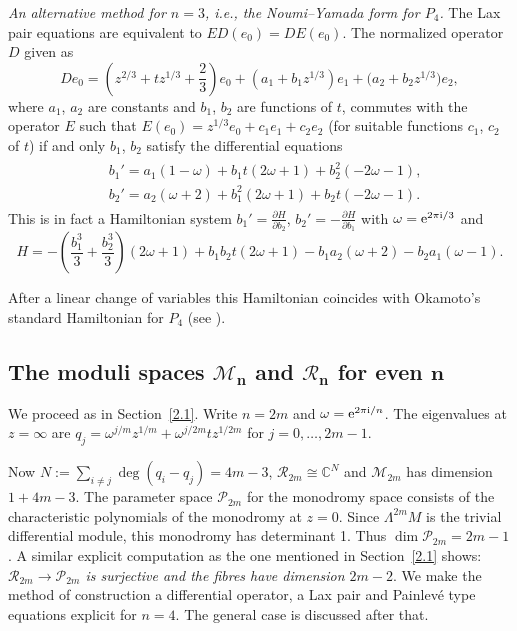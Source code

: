 \documentclass[pdftex]{sigma}
\numberwithin{equation}{section}
\begin{document}
 {\it An alternative method for $n=3$, i.e., the Noumi--Yamada form for $P_4$.}
The Lax pair equations are equivalent to $ED(e_0)=DE(e_0)$. The
normalized operator $D$ given as
\[De_0=\left(z^{2/3}+tz^{1/3}+\frac{2}{3}\right)e_0+(a_1+b_1z^{1/3})e_1+\bigl(a_2+b_2z^{1/3}\bigr)e_2,\] where
$a_1$, $a_2$ are constants and $b_1$, $b_2$ are functions of $t$, commutes with the operator $ E$ such that
$E(e_0)=z^{1/3}e_0+c_1e_1+c_2e_2$ (for suitable functions $c_1$, $c_2$ of $t$) if and only $b_1$, $b_2$ satisfy the differential equations
\begin{gather*}
\begin{split}
& b_1'=a_1(1-\omega)+b_1t(2\omega +1)+b_2^2(-2\omega -1),\\
& b_2'=a_2(\omega +2)+b_1^2(2\omega +1) +b_2t(-2\omega -1).
\end{split}
\end{gather*}
This is in fact a Hamiltonian system $b_1'=\frac{\partial H}{\partial b_2}$, $b_2'=-\frac{\partial H}{\partial b_1}$
with $\omega={\rm e}^{2\pi {\rm i}/3}$ and
\[
H=-\left(\frac{b_1^3}{3}+\frac{b_2^3}{3}\right)(2\omega +1)+b_1b_2t(2\omega +1)-b_1a_2(\omega +2) -b_2a_1(\omega -1).\]

After a linear change of variables this Hamiltonian coincides with Okamoto's standard Hamiltonian for $P_4$
(see \cite[p.~265]{O1}).

\subsection[The moduli spaces M\_n and R\_n for even n]{The moduli spaces $\boldsymbol{\mathcal{M}_n}$ and $\boldsymbol{\mathcal{R}_n}$ for even $\boldsymbol{n}$}

We proceed as in Section~\ref{2.1}.
Write $n=2m$ and $\omega ={\rm e}^{2\pi {\rm i}/n}$. The eigenvalues at $z=\infty$ are
$q_j= \omega^{j/m}z^{1/m}+ \omega ^{j/2m}tz^{1/2m}$ for $j=0,\dots ,2m-1$.

Now $N:=\sum _{i\neq j} \deg (q_i-q_j)=4m-3$, $\mathcal{R}_{2m}\cong \mathbb{C}^{N}$ and $\mathcal{M}_{2m}$
has dimension $1+4m-3$. The parameter space $\mathcal{P}_{2m}$ for the monodromy space
consists of the characteristic polynomials of the monodromy at $z=0$. Since $\Lambda^{2m}M$ is the trivial differential module, this
monodromy has determinant 1. Thus $\dim \mathcal{P}_{2m}=2m-1$. A similar explicit computation as the one
mentioned in Section~\ref{2.1} shows:
{\it $\mathcal{R}_{2m}\rightarrow \mathcal{P}_{2m}$ is surjective and the fibres have dimension $2m-2$}.
We make the method of construction a differential operator, a Lax pair and Painlev\'e type equations explicit for $n=4$. The general case is discussed after that.
\end{document}
